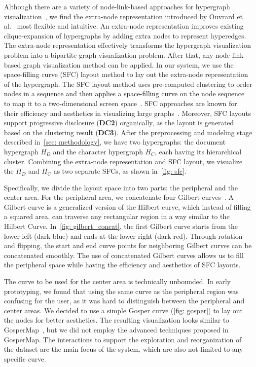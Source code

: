 Although there are a variety of node-link-based approaches for hypergraph visualization~\cite{fischer2021hypergraphsurvey}, we find the extra-node representation introduced by Ouvrard et al.~\cite{ouvrard2017hypergraph} most flexible and intuitive.
An extra-node representation improves existing clique-expansion of hypergraphs by adding extra nodes to represent hyperedges. 
The extra-node representation effectively transforms the hypergraph visualization problem into a bipartite graph visualization problem.
After that, any node-link-based graph visualization method can be applied.
In our system, we use the space-filling curve (SFC) layout method to lay out the extra-node representation of the hypergraph.
The SFC layout method uses pre-computed clustering to order nodes in a sequence and then applies a space-filling curve on the node sequence to map it to a two-dimensional screen space~\cite{muelder2008sfc}.
SFC approaches are known for their efficiency and aesthetics in visualizing large graphs~\cite{ma2013largegraph}.
Moreover, SFC layouts support progressive disclosure (\textbf{DC2}) organically, as the layout is generated based on the clustering result (\textbf{DC3}).
After the preprocessing and modeling stage described in~\autoref{sec: methodology}, we have two hypergraphs: the document hypergraph $H_D$ and the character hypergraph $H_C$, each having its hierarchical cluster.
Combining the extra-node representation and SFC layout, we visualize the $H_D$ and  $H_C$ as two separate SFCs, as shown in~\autoref{fig: sfc}.

Specifically, we divide the layout space into two parts: the peripheral and the center area.
For the peripheral area, we concatenate four Gilbert curves~\cite{gilbert}.
A Gilbert curve is a generalized version of the Hilbert curve,
which instead of filling a squared area, can traverse any rectangular region in a way similar to the Hilbert Curve.
In~\autoref{fig: gilbert_concat}, the first Gilbert curve starts from the lower left (dark blue) and ends at the lower right (dark red).
Through rotation and flipping, the start and end curve points for neighboring Gilbert curves can be concatenated smoothly.
The use of concatenated Gilbert curves allows us to fill the peripheral space while having the efficiency and aesthetics of SFC layouts.

The curve to be used for the center area is technically unbounded. 
In early prototyping, we found that using the same curve as the peripheral region was confusing for the user, as it was hard to distinguish between the peripheral and center areas.
We decided to use a simple Gosper curve (\autoref{fig: gosper}) to lay out the nodes for better aesthetics.
The resulting visualization looks similar to GosperMap~\cite{auber2013gospermap}, but we did not employ the advanced techniques proposed in GosperMap.
The interactions to support the exploration and reorganization of the dataset are the main focus of the system, which are also not limited to any specific curve.

